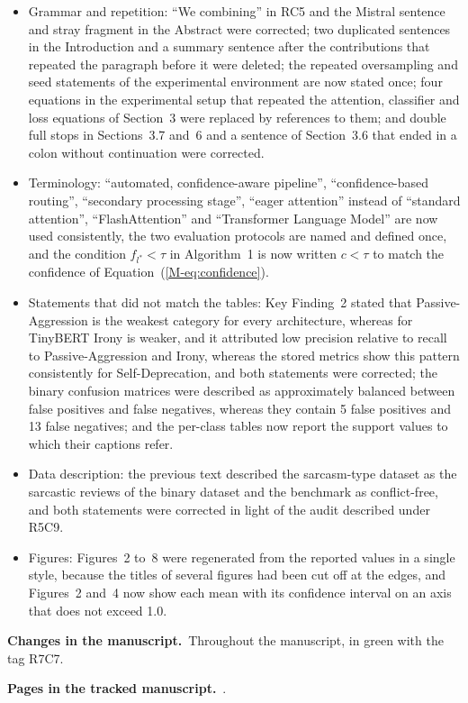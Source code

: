 \documentclass[11pt,a4paper]{article}
\newcommand{\meq}[1]{Equation~(\ref{M-#1})}
\newcommand{\changes}{\par\noindent\textbf{Changes in the manuscript.}\ }
\newcommand{\where}[1]{\par\noindent\textbf{Pages in the tracked manuscript.}\ \rvpages[M-]{#1}.}
\begin{document}
\begin{itemize}[leftmargin=1.5em,itemsep=0.2em]
\item Grammar and repetition: ``We combining'' in RC5 and the Mistral sentence and stray fragment in the Abstract were corrected; two duplicated sentences in the Introduction and a summary sentence after the contributions that repeated the paragraph before it were deleted; the repeated oversampling and seed statements of the experimental environment are now stated once; four equations in the experimental setup that repeated the attention, classifier and loss equations of Section~3 were replaced by references to them; and double full stops in Sections~3.7 and~6 and a sentence of Section~3.6 that ended in a colon without continuation were corrected.
\item Terminology: ``automated, confidence-aware pipeline'', ``confidence-based routing'', ``secondary processing stage'', ``eager attention'' instead of ``standard attention'', ``FlashAttention'' and ``Transformer Language Model'' are now used consistently, the two evaluation protocols are named and defined once, and the condition $f_{l^{*}} < \tau$ in Algorithm~1 is now written $c < \tau$ to match the confidence of \meq{eq:confidence}.
\item Statements that did not match the tables: Key Finding~2 stated that Passive-Aggression is the weakest category for every architecture, whereas for TinyBERT Irony is weaker, and it attributed low precision relative to recall to Passive-Aggression and Irony, whereas the stored metrics show this pattern consistently for Self-Deprecation, and both statements were corrected; the binary confusion matrices were described as approximately balanced between false positives and false negatives, whereas they contain 5 false positives and 13 false negatives; and the per-class tables now report the support values to which their captions refer.
\item Data description: the previous text described the sarcasm-type dataset as the sarcastic reviews of the binary dataset and the benchmark as conflict-free, and both statements were corrected in light of the audit described under R5C9.
\item Figures: Figures~2 to~8 were regenerated from the reported values in a single style, because the titles of several figures had been cut off at the edges, and Figures~2 and~4 now show each mean with its confidence interval on an axis that does not exceed 1.0.
\end{itemize}
\changes Throughout the manuscript, in green with the tag R7C7.
\where{R7C7}
\end{document}
